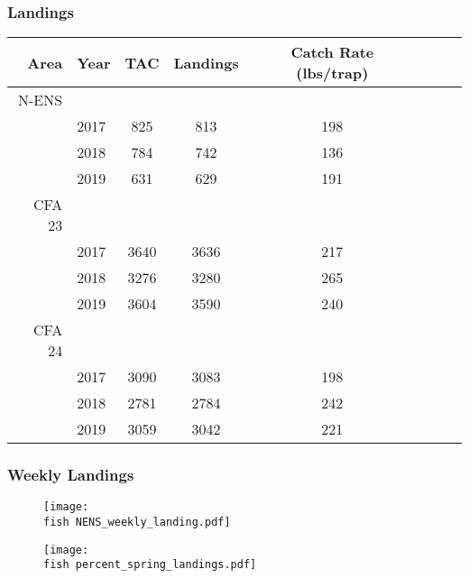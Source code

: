\documentclass{beamer}
\begin{document}
\begin{frame}
\frametitle{Landings}

\begin{table}[ht]
\centering
\begin{tabular}{rlccclrr}
  \hline
  Area & Year & TAC & Landings & Catch Rate (lbs/trap) \\ 
  \hline
 N-ENS & & & & \\
 & 2017 & 825 & 813 & 198 \\
 & 2018 & 784 & 742 & 136 \\
 & 2019 & 631 & 629 & 191 \\
\hline
 CFA 23 & & & & \\
 & 2017 & 3640 & 3636 & 217 \\
 & 2018 & 3276 & 3280 & 265 \\
 & 2019 & 3604 & 3590 & 240 \\
 \hline
 CFA 24 & & & & \\
 & 2017 & 3090 & 3083 & 198 \\
 & 2018 & 2781 & 2784 & 242 \\
 & 2019 & 3059 & 3042 & 221 \\

\hline
   \hline
\end{tabular}
\end{table}



\end{frame}



\begin{frame}
\frametitle{Weekly Landings}
	\begin{figure}

 \vspace*{-0.5cm}
 \centerline{\texttt{[image: \\fish NENS\_weekly\_landing.pdf]}}

 \end{figure}
\end{frame}


\begin{frame}
\begin{figure}

 \vspace*{-0.25cm}
 \centerline{\texttt{[image: \\fish percent\_spring\_landings.pdf]}}

 \end{figure}
\end{frame}
\end{document}
